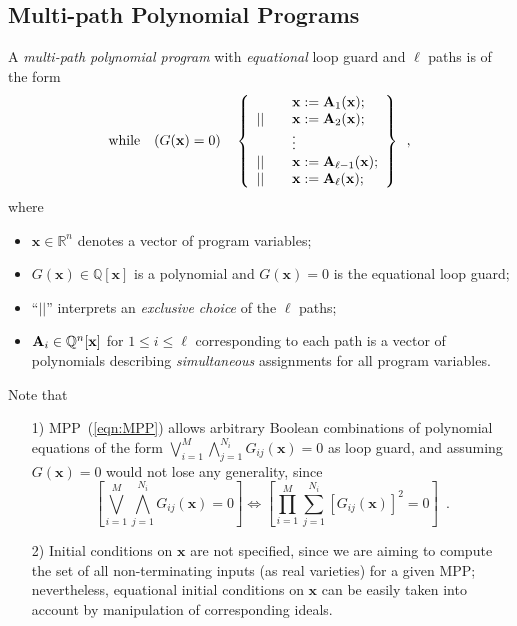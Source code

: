 \documentclass{jssc}
\newcommand{\while}{{\rm while}}
\newcommand{\xx}{\mathbf{x}}
\begin{document}
\subsection{Multi-path Polynomial Programs}
\begin{definition}
A \emph{multi-path polynomial program} with \emph{equational} loop guard and $\ell$ paths is of the form
\begin{equation}\label{eqn:MPP}
\while \quad (G(\xx)=0) \quad \left\{
\begin{array}{ll}
   & \quad \xx:= {\bf A}_1(\xx); \\
|| & \quad \xx:= {\bf A}_2(\xx); \\
   & \quad \vdots \\
|| & \quad \xx:= {\bf A}_{\ell-1}(\xx); \\
|| & \quad \xx:= {\bf A}_{\ell}(\xx); \\
\end{array}
\right\} \enspace ,
\end{equation}
where
\begin{itemize}
\item $\xx \in \mathbb{R}^n$ denotes a vector of program variables;
\item $G(\xx) \in \mathbb{Q}[\xx]$ is a polynomial and $G(\xx)=0$ is the equational loop guard;
\item ``$||$'' interprets an {\it exclusive choice} of the $\ell$ paths;
\item ${\bf A}_i \in \mathbb{Q}^n[\xx]$ for $1 \leq i \leq \ell$ corresponding to each path is a vector of polynomials describing \emph{simultaneous} assignments for all program variables.
\end{itemize}

\end{definition}
Note that
\begin{enumerate}
\item[1)] MPP~(\ref{eqn:MPP}) allows arbitrary Boolean combinations of polynomial equations of the form $\bigvee_{i=1}^M \bigwedge_{j=1}^{N_i} G_{ij}(\xx)=0$ as loop guard, and assuming $G(\xx)=0$ would not lose any generality, since
    \begin{equation}\label{eqn:guard}
    \left[ \bigvee_{i=1}^M \bigwedge_{j=1}^{N_i} G_{ij}(\xx) = 0 \right]  \Longleftrightarrow \left[ \prod_{i=1}^M \sum_{j=1}^{N_i} [G_{ij}(\xx)]^2 = 0 \right] \enspace .
    \end{equation}
\item[2)] Initial conditions on $\xx$ are not specified, since we are aiming to compute the set of all non-terminating inputs (as real varieties) for a given MPP; nevertheless, equational initial conditions on $\xx$ can be easily taken into account by manipulation of corresponding ideals.
\end{enumerate}
\end{document}
